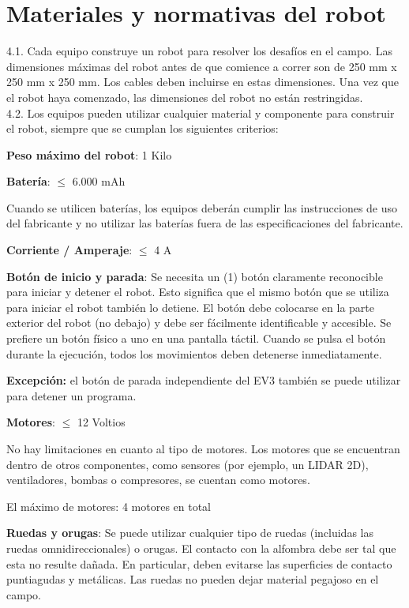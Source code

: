 \documentclass[12pt,a4paper]{article}
\begin{document}
\section{Materiales y normativas del robot}
4.1. Cada equipo construye un robot para resolver los desafíos en el campo. Las dimensiones máximas del robot antes de que comience a correr son de 250 mm x 250 mm x 250 mm. Los cables deben incluirse en estas dimensiones. Una vez que el robot haya comenzado, las dimensiones del robot no están restringidas. \\
4.2. Los equipos pueden utilizar cualquier material y componente para construir el robot, siempre que se cumplan los siguientes criterios:

\vspace{0.5cm}
\noindent
\textbf{Peso máximo del robot}: 1 Kilo

\textbf{Batería}: $\leq$ 6.000 mAh 

 Cuando se utilicen baterías, los equipos deberán cumplir las instrucciones de uso del fabricante y no utilizar las baterías fuera de las especificaciones del fabricante.

\textbf{Corriente / Amperaje}: $\leq$ 4 A

\textbf{Botón de inicio y parada}: Se necesita un (1) botón claramente reconocible para iniciar y detener el robot. Esto significa que el mismo botón que se utiliza para iniciar el robot también lo detiene. El botón debe colocarse en la parte exterior del robot (no debajo) y debe ser fácilmente identificable y accesible. Se prefiere un botón físico a uno en una pantalla táctil. Cuando se pulsa el botón durante la ejecución, todos los movimientos deben detenerse inmediatamente. 

 \textbf{Excepción:} el botón de parada independiente del EV3 también se puede utilizar para detener un programa.

\textbf{Motores}: $\leq$ 12 Voltios 

 No hay limitaciones en cuanto al tipo de motores. Los motores que se encuentran dentro de otros componentes, como sensores (por ejemplo, un LIDAR 2D), ventiladores, bombas o compresores, se cuentan como motores. 

 El máximo de motores: 4 motores en total

\textbf{Ruedas y orugas}: Se puede utilizar cualquier tipo de ruedas (incluidas las ruedas omnidireccionales) o orugas. El contacto con la alfombra debe ser tal que esta no resulte dañada. En particular, deben evitarse las superficies de contacto puntiagudas y metálicas. Las ruedas no pueden dejar material pegajoso en el campo.
\end{document}
